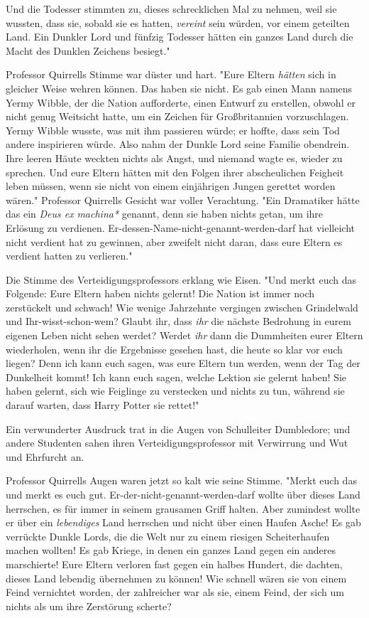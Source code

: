 {Und die Todesser stimmten zu, dieses schrecklichen Mal zu nehmen, weil sie wussten, dass sie, sobald sie es hatten, \emph{vereint} sein würden, vor einem geteilten Land. Ein Dunkler Lord und fünfzig Todesser hätten ein ganzes Land durch die Macht des Dunklen Zeichens besiegt."

Professor Quirrells Stimme war düster und hart. "Eure Eltern \emph{hätten} sich in gleicher Weise wehren können. Das haben sie nicht. Es gab einen Mann namens Yermy Wibble, der die Nation aufforderte, einen Entwurf zu erstellen, obwohl er nicht genug Weitsicht hatte, um ein Zeichen für Großbritannien vorzuschlagen. Yermy Wibble wusste, was mit ihm passieren würde; er hoffte, dass sein Tod andere inspirieren würde. Also nahm der Dunkle Lord seine Familie obendrein. Ihre leeren Häute weckten nichts als Angst, und niemand wagte es, wieder zu sprechen. Und eure Eltern hätten mit den Folgen ihrer abscheulichen Feigheit leben müssen, wenn sie nicht von einem einjährigen Jungen gerettet worden wären." Professor Quirrells Gesicht war voller Verachtung. "Ein Dramatiker hätte das ein \emph{Deus ex} \emph{machina*} genannt, denn sie haben nichts getan, um ihre Erlösung zu verdienen. Er-dessen-Name-nicht-genannt-werden-darf hat vielleicht nicht verdient hat zu gewinnen, aber zweifelt nicht daran, dass eure Eltern es verdient hatten zu verlieren."

Die Stimme des Verteidigungsprofessors erklang wie Eisen. "Und merkt euch das Folgende: Eure Eltern haben nichts gelernt! Die Nation ist immer noch zerstückelt und schwach! Wie wenige Jahrzehnte vergingen zwischen Grindelwald und Ihr-wisst-schon-wem? Glaubt ihr, dass \emph{ihr} die nächste Bedrohung in eurem eigenen Leben nicht sehen werdet? Werdet \emph{ihr} dann die Dummheiten eurer Eltern wiederholen, wenn ihr die Ergebnisse gesehen hast, die heute so klar vor euch liegen? Denn ich kann euch sagen, was eure Eltern tun werden, wenn der Tag der Dunkelheit kommt! Ich kann euch sagen, welche Lektion sie gelernt haben! Sie haben gelernt, sich wie Feiglinge zu verstecken und nichts zu tun, während sie darauf warten, dass Harry Potter sie rettet!"

Ein verwunderter Ausdruck trat in die Augen von Schulleiter Dumbledore; und andere Studenten sahen ihren Verteidigungsprofessor mit Verwirrung und Wut und Ehrfurcht an.

Professor Quirrells Augen waren jetzt so kalt wie seine Stimme. "Merkt euch das und merkt es euch gut. Er-der-nicht-genannt-werden-darf wollte über dieses Land herrschen, es für immer in seinem grausamen Griff halten. Aber zumindest wollte er über ein \emph{lebendiges} Land herrschen und nicht über einen Haufen Asche! Es gab verrückte Dunkle Lords, die die Welt nur zu einem riesigen Scheiterhaufen machen wollten! Es gab Kriege, in denen ein ganzes Land gegen ein anderes marschierte! Eure Eltern verloren fast gegen ein halbes Hundert, die dachten, dieses Land lebendig übernehmen zu können! Wie schnell wären sie von einem Feind vernichtet worden, der zahlreicher war als sie, einem Feind, der sich um nichts als um ihre Zerstörung scherte?

}
